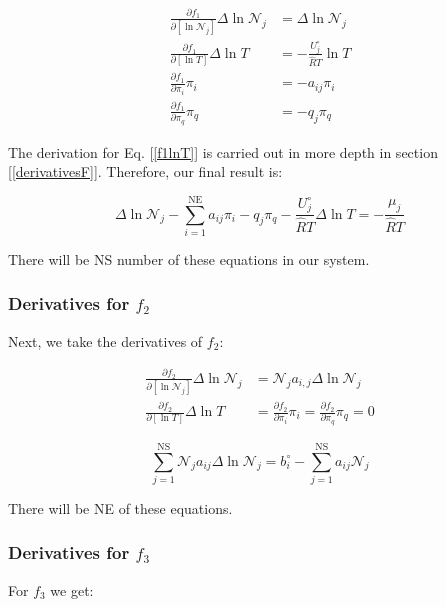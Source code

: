 \documentclass[10pt]{article}
\begin{document}
\begin{flushleft}
\begin{align}
    \frac{\partial f_1}{\partial [\ln \mathcal{N}_j]} \Delta \ln \mathcal{N}_j &= \Delta \ln \mathcal{N}_j
    \\ \frac{\partial f_1}{\partial [\ln T]} \Delta \ln T &= -\frac{U_j^\circ}{\hat{R}T} \ln T
    \label{f1lnT}
    \\ \frac{\partial f_1}{\partial \pi_i} \pi_i &= -a_{ij} \pi_i
    \\ \frac{\partial f_1}{\partial \pi_q} \pi_q &= -q_j \pi_q
\end{align} 

The derivation for Eq. [\ref{f1lnT}] is carried out in more depth in section [\ref{derivativesF}]. Therefore, our final result is:

\begin{equation*}
    \boxed{\Delta \ln \mathcal{N}_j - \sum_{i=1}^\text{NE}a_{ij} \pi_i - q_j \pi_q -\frac{U_j^\circ}{\hat{R}T} \Delta \ln T  = -\frac{\mu_j}{\hat{R}T} }
\end{equation*}

There will be NS number of these equations in our system. 


\subsubsection{Derivatives for $f_2$}
Next, we take the derivatives of $f_2$:

\begin{align}
    \frac{\partial f_2}{\partial [\ln \mathcal{N}_j]} \Delta \ln \mathcal{N}_j &= \mathcal{N}_j a_{i,j} \Delta \ln \mathcal{N}_j
    \\ \frac{\partial f_2}{\partial [\ln T]} \Delta \ln T &= \frac{\partial f_2}{\partial \pi_i} \pi_i = \frac{\partial f_2}{\partial \pi_q} \pi_q = 0
\end{align} 

\begin{equation*}
    \boxed{ \sum_{j=1}^\text{NS}\mathcal{N}_j a_{ij} \Delta \ln \mathcal{N}_j = b_i^\circ - \sum_{j=1}^\text{NS} a_{ij} \mathcal{N}_j}
\end{equation*}

There will be NE of these equations. 

\subsubsection{Derivatives for $f_3$} 

For $f_3$ we get:


\end{flushleft}
\end{document}
